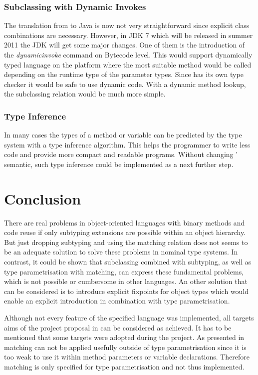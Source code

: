 \subsubsection{Subclassing with Dynamic Invokes}
The translation from \ooplss to Java is now not very straightforward since
explicit class combinations are necessary. However, in JDK 7 which will
be released in summer 2011 the JDK will get some major changes. One
of them is the introduction of the \emph{dynamicinvoke} command on
Bytecode level. This would support dynamically typed language on the
platform where the most suitable method would be called depending on the
runtime type of the parameter types. Since \ooplss has its own type
checker it would be safe to use dynamic code. With a dynamic method
lookup, the subclassing relation would be much more simple.

\subsubsection{Type Inference}
In many cases the types of a method or variable can be predicted
by the type system with a type inference algorithm. This helps
the programmer to write less code and provide more compact and readable
programs. Without changing \ooplss' semantic, such type inference
could be implemented as a next further step.

\section{Conclusion}
\label{ctr:conclusion}
There are real problems in object-oriented languages with binary methods
and code reuse if only subtyping extensions are possible within an object
hierarchy. But just dropping subtyping and using the matching relation
does not seems to be an adequate solution to solve these problems in
nominal type systems. In contrast, it could be shown that subclassing
combined with subtyping, as well as type parametrisation with matching,
can express these fundamental problems, which is not possible or
cumbersome in other languages. An other solution that can be considered
is to introduce explicit fixpoints for object types which would enable
an explicit \mytype introduction in combination with type parametrisation.

Although not every feature of the specified language was implemented,
all targets aims of the project proposal in 
can be considered as achieved. It has to be mentioned that some targets
were adopted during the project. As presented in 
matching can not be applied usefully outside of type parametrisation
since it is too weak to use it within method parameters or variable
declarations.  Therefore matching is only specified for type
parametrisation and not thus implemented.
